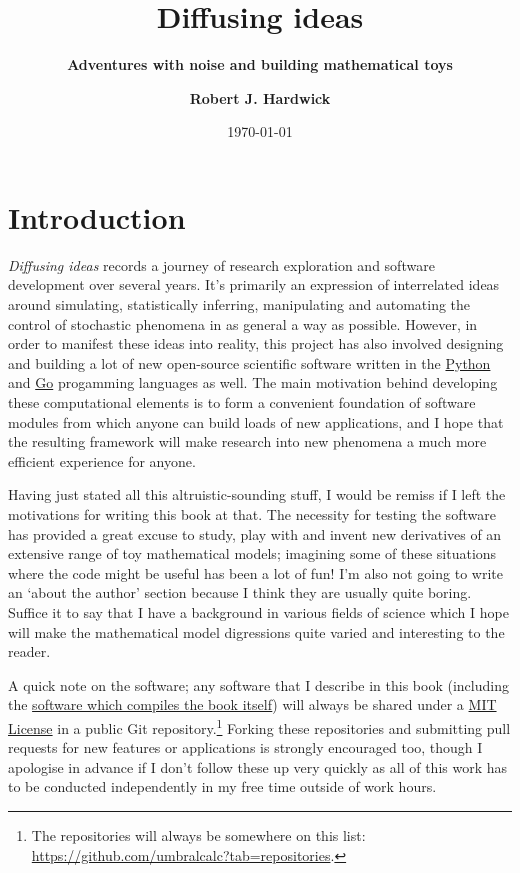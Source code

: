 \documentclass{book}
\title{\Huge \bfseries\sffamily Diffusing ideas}
\subtitle{\Large \bfseries\sffamily \color{gray75} Adventures with noise and building mathematical toys}
\author{\bfseries\sffamily Robert J. Hardwick}
\date{\today}
\begin{document}
\maketitle
\frontmatter

\chapter*{Introduction}

\emph{Diffusing ideas} records a journey of research exploration and software development over several years. It's primarily an expression of interrelated ideas around simulating, statistically inferring, manipulating and automating the control of stochastic phenomena in as general a way as possible. However, in order to manifest these ideas into reality, this project has also involved designing and building a lot of new open-source scientific software written in the \href{https://www.python.org/}{Python} and \href{https://go.dev/}{Go} progamming languages as well. The main motivation behind developing these computational elements is to form a convenient foundation of software modules from which anyone can build loads of new applications, and I hope that the resulting framework will make research into new phenomena a much more efficient experience for anyone. 

Having just stated all this altruistic-sounding stuff, I would be remiss if I left the motivations for writing this book at that. The necessity for testing the software has provided a great excuse to study, play with and invent new derivatives of an extensive range of toy mathematical models; imagining some of these situations where the code might be useful has been a lot of fun! I'm also not going to write an `about the author' section because I think they are usually quite boring. Suffice it to say that I have a background in various fields of science which I hope will make the mathematical model digressions quite varied and interesting to the reader.

A quick note on the software; any software that I describe in this book (including the \href{https://github.com/umbralcalc/diffusing-ideas}{software which compiles the book itself}) will always be shared under a \href{https://opensource.org/licenses/MIT}{MIT License} in a public Git repository.\footnote{The repositories will always be somewhere on this list: \href{https://github.com/umbralcalc?tab=repositories}{https://github.com/umbralcalc?tab=repositories}.} Forking these repositories and submitting pull requests for new features or applications is strongly encouraged too, though I apologise in advance if I don't follow these up very quickly as all of this work has to be conducted independently in my free time outside of work hours.
\end{document}
